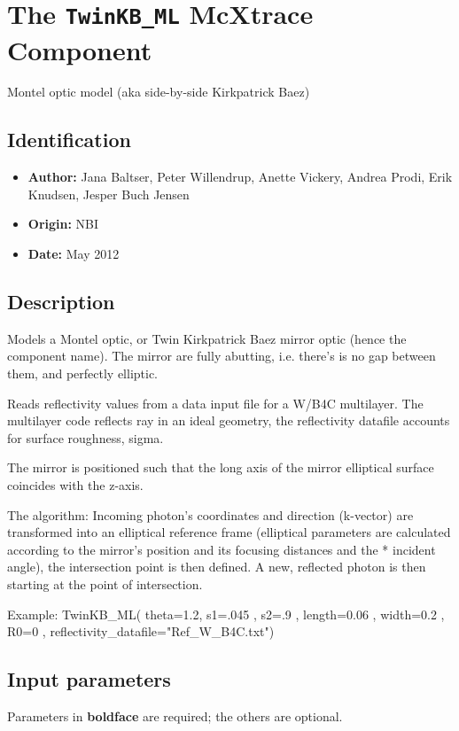 \section{The \texttt{TwinKB\_ML} McXtrace Component}
Montel optic model (aka side-by-side Kirkpatrick Baez)

\subsection*{Identification}
\begin{itemize}
  \item \textbf{Author:} Jana Baltser, Peter Willendrup, Anette Vickery, Andrea Prodi, Erik Knudsen, Jesper Buch Jensen
  \item \textbf{Origin:} NBI
  \item \textbf{Date:} May 2012
\end{itemize}

\subsection*{Description}
Models a Montel optic, or Twin Kirkpatrick Baez mirror optic (hence the component name). The mirror are fully abutting, i.e. there's is no gap between them, and perfectly elliptic.

Reads reflectivity values from a data input file for a W/B4C multilayer. The multilayer code reflects ray in an ideal geometry, the reflectivity datafile accounts for surface roughness, sigma.

The mirror is positioned such that the long axis of the mirror elliptical surface coincides with the z-axis.

The algorithm: Incoming photon's coordinates and direction (k-vector) are transformed into an elliptical reference frame (elliptical parameters are calculated according to the mirror's position and its focusing distances and the * incident angle), the intersection point is then defined. A new, reflected photon is then starting at the point of intersection.

Example: TwinKB\_ML( theta=1.2, s1=.045 , s2=.9 , length=0.06 , width=0.2 , R0=0 , reflectivity\_datafile="Ref\_W\_B4C.txt")

\subsection*{Input parameters}
Parameters in \textbf{boldface} are required; the others are optional.

